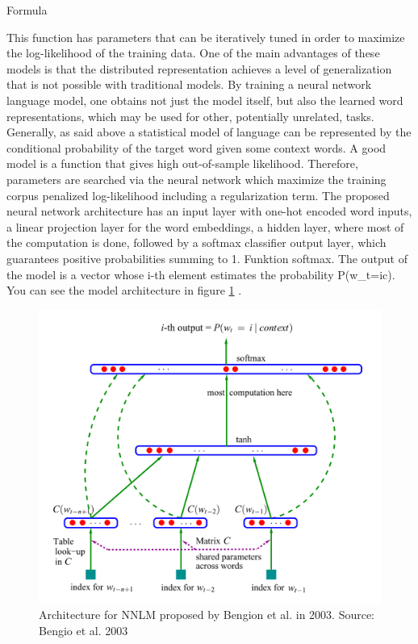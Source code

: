 \documentclass[]{krantz}
\begin{document}
Formula

This function has parameters that can be iteratively tuned in order to maximize the log-likelihood of the training data. One of the main advantages of these models is that the distributed representation achieves a level of generalization that is not possible with traditional models. By training a neural network language model, one obtains not just the model itself, but also the learned word representations, which may be used for other, potentially unrelated, tasks.
Generally, as said above a statistical model of language can be represented by the conditional probability of the target word given some context words. A good model is a function that gives high out-of-sample likelihood. Therefore, parameters are searched via the neural network which maximize the training corpus penalized log-likelihood including a regularization term.
The proposed neural network architecture has an input layer with one-hot encoded word inputs, a linear projection layer for the word embeddings, a hidden layer, where most of the computation is done, followed by a softmax classifier output layer, which guarantees positive probabilities summing to 1. Funktion softmax. The output of the model is a vector whose i-th element estimates the probability P(w\_t=i\textbar{}c). You can see the model architecture in figure \ref{fig:bengio-nnlm} .

\begin{figure}
\includegraphics[width=\textwidth]{figures/01-01-foundations-applications-of-modern-NLP/01-01_bengio_nnlm} \caption{Architecture for NNLM proposed by Bengion et al. in 2003.  Source: Bengio et al. 2003}\label{fig:bengio-nnlm}
\end{figure}
\end{document}
